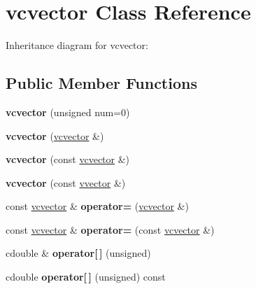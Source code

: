\hypertarget{classvcvector}{}\section{vcvector Class Reference}
\label{classvcvector}


Inheritance diagram for vcvector\+:
\subsection*{Public Member Functions}
\begin{DoxyCompactItemize}
\item 
{\bfseries vcvector} (unsigned num=0)\hypertarget{classvcvector_a58c72961b4938ad1a21aa729bdcc0955}{}\label{classvcvector_a58c72961b4938ad1a21aa729bdcc0955}

\item 
{\bfseries vcvector} (\hyperlink{classvcvector}{vcvector} \&)\hypertarget{classvcvector_ab2d3ec936d2964e1792081efdf638bf0}{}\label{classvcvector_ab2d3ec936d2964e1792081efdf638bf0}

\item 
{\bfseries vcvector} (const \hyperlink{classvcvector}{vcvector} \&)\hypertarget{classvcvector_a5746b3d2ea3975ad0461f06ec9c3f730}{}\label{classvcvector_a5746b3d2ea3975ad0461f06ec9c3f730}

\item 
{\bfseries vcvector} (const \hyperlink{classvvector}{vvector} \&)\hypertarget{classvcvector_aa05876cf8f57ad97996940a6371aab84}{}\label{classvcvector_aa05876cf8f57ad97996940a6371aab84}

\item 
const \hyperlink{classvcvector}{vcvector} \& {\bfseries operator=} (\hyperlink{classvcvector}{vcvector} \&)\hypertarget{classvcvector_ade99b84fc66b0a41acd40ca336f5c7fc}{}\label{classvcvector_ade99b84fc66b0a41acd40ca336f5c7fc}

\item 
const \hyperlink{classvcvector}{vcvector} \& {\bfseries operator=} (const \hyperlink{classvcvector}{vcvector} \&)\hypertarget{classvcvector_a8a7a229272c41c66cec302adbd6fe7e3}{}\label{classvcvector_a8a7a229272c41c66cec302adbd6fe7e3}

\item 
cdouble \& {\bfseries operator\mbox{[}$\,$\mbox{]}} (unsigned)\hypertarget{classvcvector_a02176105e3b7c5c1cc4f1ab98480f881}{}\label{classvcvector_a02176105e3b7c5c1cc4f1ab98480f881}

\item 
cdouble {\bfseries operator\mbox{[}$\,$\mbox{]}} (unsigned) const \hypertarget{classvcvector_a6af765dda1b65ceb9d4643b0018ccac1}{}\label{classvcvector_a6af765dda1b65ceb9d4643b0018ccac1}


\end{DoxyCompactItemize}
